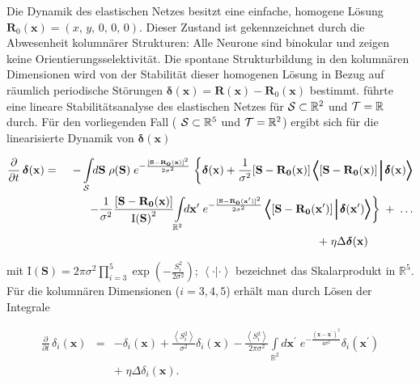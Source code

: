 Die Dynamik des elastischen Netzes besitzt eine einfache, homogene Lösung
$\mathbf{R}_0(\mathbf{x}) = (x,\, y,\, 0,\, 0,\, 0) $. Dieser Zustand ist
gekennzeichnet durch die Abwesenheit kolumnärer Strukturen: Alle Neurone
sind binokular und zeigen keine Orientierungsselektivität. Die spontane
Strukturbildung in den kolumnären Dimensionen wird von der Stabilität
dieser homogenen Lösung in Bezug auf räumlich periodische Störungen
$\boldsymbol{\delta}(\mathbf{x}) = \mathbf{R(x)}-\mathbf{R}_0(\mathbf{x})$
bestimmt.  \textcite{hohenstein:1994} führte eine lineare
Stabilitätsanalyse des elastischen Netzes für ${\cal
    S}\subset\mathbb{R}^2$ und ${\cal T}=\mathbb{R}$ durch. Für den
vorliegenden Fall ( ${\cal S}\subset\mathbb{R}^5$ und ${\cal
    T}=\mathbb{R}^2$) ergibt sich für die linearisierte Dynamik von
$\boldsymbol{\delta}(\mathbf{x})$

\begin{small}
    \begin{eqnarray*}
        \frac{\partial}{\partial t}\, \mathbf{\boldsymbol{\delta}(x)} &=&
        -\int\limits_{\cal S}\!\!d\mathbf{S}\; \rho(\mathbf{S})\;
        e^{-\frac{[\mathbf{S-R_0(x)}]^2}{2\sigma^2}}\;
        \biggl\{\mathbf{\boldsymbol{\delta}(x)}\biggr.+\frac{1}{\sigma^2}
        [\mathbf{S-R_0(x)}]\, \pmb{\Bigl<}\!\left[\mathbf{S-R_0(x)}\right]\pmb{\Big|\,
            \delta}\mathbf{(x)}\pmb{\Bigr>}\nonumber\\
        &&\qquad-\frac{1}{\sigma^2}\frac{[\mathbf{S-R_0(x)}]}{\text{I}\mathbf{(S)}^2}
        \biggl.\int\limits_{\mathbb{R}^2}\!\!d\mathbf{x}^\prime\;
        e^{-\frac{[\mathbf{S-R_0(\mathbf{x}^\prime)}]^2}{2\sigma^2}}\,
        \pmb{\Bigl<}\!\left[\mathbf{S-R_0(\mathbf{x}^\prime)}\right]\pmb{\Big|\,
            \delta}\mathbf{(\mathbf{x}^\prime)}\pmb{\Bigr>}\biggr\}\; +\; \ldots\nonumber\\ &&+\;
        \eta\Delta\mathbf{\boldsymbol{\delta}(x)}\qquad\qquad
        \label{lindyn}
    \end{eqnarray*}
\end{small}

\noindent mit $\text{I}\mathbf{(S)} = 2\pi \sigma^2 \prod_{i=3}^5
\exp\left({-\frac{S_i^2}{2\sigma^2}}\right)$; $\pmb{\left<\cdot|\cdot\right>}$ bezeichnet
das Skalarprodukt in $\mathbb{R}^5$. Für die kolumnären Dimensionen
($i=3,4,5$) erhält man durch Lösen der Integrale

\begin{eqnarray*}
    \frac{\partial}{\partial t}\, \delta_i(\mathbf{x}) &=& -\delta_i(\mathbf{x})
    +\frac{\left<S_i^2\right>}{\sigma^2}\delta_i(\mathbf{x})-\frac{\left<S_i^2
        \right>}{2\pi \sigma^2}\int\limits_{\mathbb{R}^2}\!\!d\mathbf{x}^\prime\;
    e^{-\frac{\mathbf{(x-x^\prime)}^2}{4\sigma^2}}\delta_i(\mathbf{x}^\prime)\nonumber\\
    && +\; \eta\Delta\delta_i(\mathbf{x}).
\end{eqnarray*}

